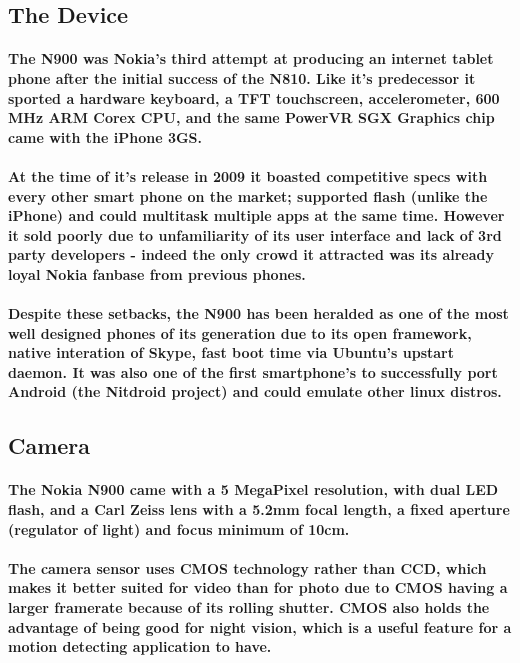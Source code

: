 \documentclass[11pt]{article} %
\begin{document}
\subsection{The Device}
\paragraph{The N900 was Nokia's third attempt at producing an internet tablet phone after the initial success of the N810. Like it's predecessor it sported a hardware keyboard, a TFT touchscreen, accelerometer, 600 MHz ARM Corex CPU, and the same PowerVR SGX Graphics chip came with the iPhone 3GS.}
\paragraph{At the time of it's release in 2009 it boasted competitive specs with every other smart phone on the market; supported flash (unlike the iPhone) and could multitask multiple apps at the same time. However it sold poorly due to unfamiliarity of its user interface and lack of 3rd party developers - indeed the only crowd it attracted was its already loyal Nokia fanbase from previous phones.}
\paragraph{Despite these setbacks, the N900 has been heralded as one of the most well designed phones of its generation due to its open framework, native interation of Skype, fast boot time via Ubuntu's upstart daemon. It was also one of the first smartphone's to successfully port Android (the Nitdroid project) and could emulate other linux distros.}

\subsection{Camera}
\paragraph{The Nokia N900 came with a 5 MegaPixel resolution, with dual LED flash, and a Carl Zeiss lens with a 5.2mm focal length, a fixed aperture (regulator of light) and focus minimum of 10cm.}
\paragraph{The camera sensor uses CMOS technology rather than CCD, which makes it better suited for video than for photo due to CMOS having a larger framerate because of its rolling shutter. CMOS also holds the advantage of being good for night vision, which is a useful feature for a motion detecting application to have.}
\end{document}
